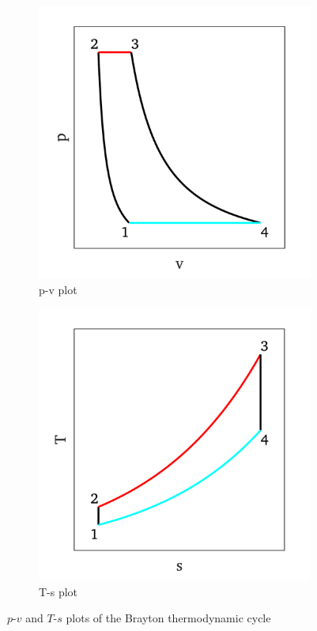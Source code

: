 \documentclass[a4paper, 11pt, oneside]{report}
\begin{document}
\begin{figure}[H]
	\centering
	\begin{subfigure}{.45\textwidth}
		\centering
		\includegraphics[width=\linewidth]{figs/brayton_cycle_pv_plot.png}
		\caption{p-v plot}
		\label{fig:brayton_cycle_pv_plot}
	\end{subfigure}
	\hspace{0.05\textwidth}
	\begin{subfigure}{.45\textwidth}
		\centering
		\includegraphics[width=\linewidth]{figs/brayton_cycle_ts_plot.png}
		\caption{T-s plot}
		\label{fig:brayton_cycle_ts_plot}
	\end{subfigure}
	\caption{$p$-$v$ and $T$-$s$ plots of the Brayton thermodynamic cycle}
	\label{fig:brayton_cycle_plots}
\end{figure}
\end{document}
